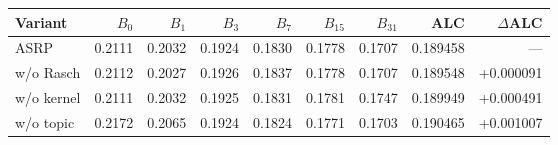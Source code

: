 \begin{tabular}{lrrrrrrrr}
\toprule
Variant & $B_0$ & $B_1$ & $B_3$ & $B_7$ & $B_{15}$ & $B_{31}$ & ALC & $\Delta$ALC\\
\midrule
ASRP & 0.2111 & 0.2032 & 0.1924 & 0.1830 & 0.1778 & 0.1707 & 0.189458 & ---\\
w/o Rasch & 0.2112 & 0.2027 & 0.1926 & 0.1837 & 0.1778 & 0.1707 & 0.189548 & +0.000091\\
w/o kernel & 0.2111 & 0.2032 & 0.1925 & 0.1831 & 0.1781 & 0.1747 & 0.189949 & +0.000491\\
w/o topic & 0.2172 & 0.2065 & 0.1924 & 0.1824 & 0.1771 & 0.1703 & 0.190465 & +0.001007\\
\bottomrule
\end{tabular}
